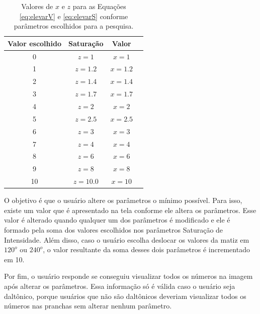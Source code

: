 \documentclass[	12pt, Times, openright, twoside, a4paper, english, brazil]{abntex2}
\begin{document}
\begin{table}[ht]
\centering
\begin{tabular}{cccc}
\hline      
\textbf{Valor escolhido} & \textbf{Saturação} & \textbf{Valor}     \\ \hline
0                        & $z = 1$            &  $x = 1$                          \\ \hline
1                        & $z = 1.2$          &  $x = 1.2$                          \\ \hline
2                        & $z = 1.4$          &  $x = 1.4$                          \\ \hline 
3                        & $z = 1.7$          &  $x = 1.7$                          \\ \hline
4                        & $z = 2$            &  $x = 2$                            \\ \hline
5                        & $z = 2.5$          &  $x = 2.5$                           \\ \hline
6                        & $z = 3$            &  $x = 3$                           \\ \hline
7                        & $z = 4$            &  $x = 4$                           \\ \hline
8                        & $z = 6$            &  $x = 6$                           \\ \hline
9                        & $z = 8$            &  $x = 8$                           \\ \hline
10                       & $z = 10.0$         &  $x = 10$                           \\ \hline

\end{tabular}
\caption{Valores de $x$ e $z$ para as Equações \ref{eq:elevarV} e \ref{eq:elevarS} conforme parâmetros escolhidos para a pesquisa.}
\label{tab:parametrosPesquisa}
\end{table}

O objetivo é que o usuário altere os parâmetros o mínimo possível. Para isso, existe um valor que é apresentado na tela conforme ele altera os parâmetros. Esse valor é alterado quando qualquer um dos parâmetros é modificado e ele é formado pela soma dos valores escolhidos nos parâmetros Saturação de Intensidade. Além disso, caso o usuário escolha deslocar os valores da matiz em $120^o$ ou $240^o$, o valor resultante da soma desses dois parâmetros é incrementado em 10.

Por fim, o usuário responde se conseguiu visualizar todos os números na imagem após alterar os parâmetros. Essa informação só é válida caso o usuário seja daltônico, porque usuários que não são daltônicos deveriam visualizar todos os números nas pranchas sem alterar nenhum parâmetro.
\end{document}
